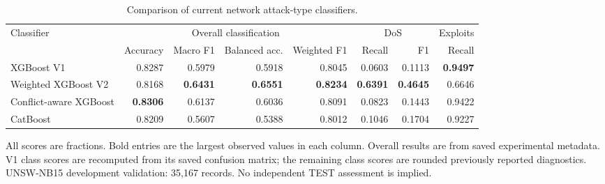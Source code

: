 \begin{table}[t]
\centering
\caption{Comparison of current network attack-type classifiers.}
\label{tab:current_attack_models}
\small
\begin{tabular}{lrrrrrrr}
\toprule
Classifier & \multicolumn{4}{c}{Overall classification} & \multicolumn{2}{c}{DoS} & \multicolumn{1}{c}{Exploits} \\
\cmidrule(lr){2-5}\cmidrule(lr){6-7}\cmidrule(lr){8-8}
 & Accuracy & Macro F1 & Balanced acc. & Weighted F1 & Recall & F1 & Recall \\
\midrule
XGBoost V1 & 0.8287 & 0.5979 & 0.5918 & 0.8045 & 0.0603 & 0.1113 & \textbf{0.9497} \\
Weighted XGBoost V2 & 0.8168 & \textbf{0.6431} & \textbf{0.6551} & \textbf{0.8234} & \textbf{0.6391} & \textbf{0.4645} & 0.6646 \\
Conflict-aware XGBoost & \textbf{0.8306} & 0.6137 & 0.6036 & 0.8091 & 0.0823 & 0.1443 & 0.9422 \\
CatBoost & 0.8209 & 0.5607 & 0.5388 & 0.8012 & 0.1046 & 0.1704 & 0.9227 \\
\bottomrule
\end{tabular}
\vspace{2pt}
\parbox{\textwidth}{\footnotesize All scores are fractions. Bold entries are the largest observed values in each column. Overall results are from saved experimental metadata. V1 class scores are recomputed from its saved confusion matrix; the remaining class scores are rounded previously reported diagnostics. UNSW-NB15 development validation: 35,167 records. No independent TEST assessment is implied.}
\end{table}
